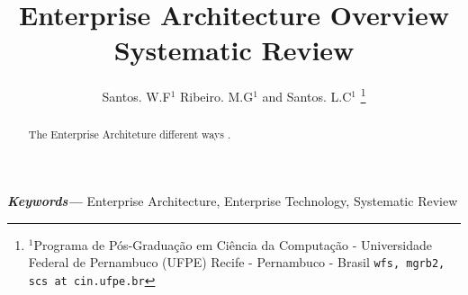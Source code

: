 \documentclass[letterpaper, 10 pt, conference]{ieeeconf}  %
\title{\LARGE \bf
Enterprise Architecture Overview Systematic Review
}
\author{Santos. W.F$^{1}$ Ribeiro. M.G$^{1}$ and Santos. L.C$^{1}$%
\thanks{$^{1}$Programa de Pós-Graduação em Ciência da Computação - Universidade Federal de Pernambuco (UFPE)
Recife - Pernambuco - Brasil
        {\tt\small {wfs, mgrb2, scs} at cin.ufpe.br}}%
}
\providecommand{\palavrasChaves}[1]
{
  \small
  \textbf{\textit{Keywords---}} #1
}
\begin{document}
\maketitle
\thispagestyle{empty}
\pagestyle{empty}


\begin{abstract}
The Enterprise Architeture different ways .
\end{abstract}

\palavrasChaves{Enterprise Architecture, Enterprise Technology, Systematic Review}


\end{document}
